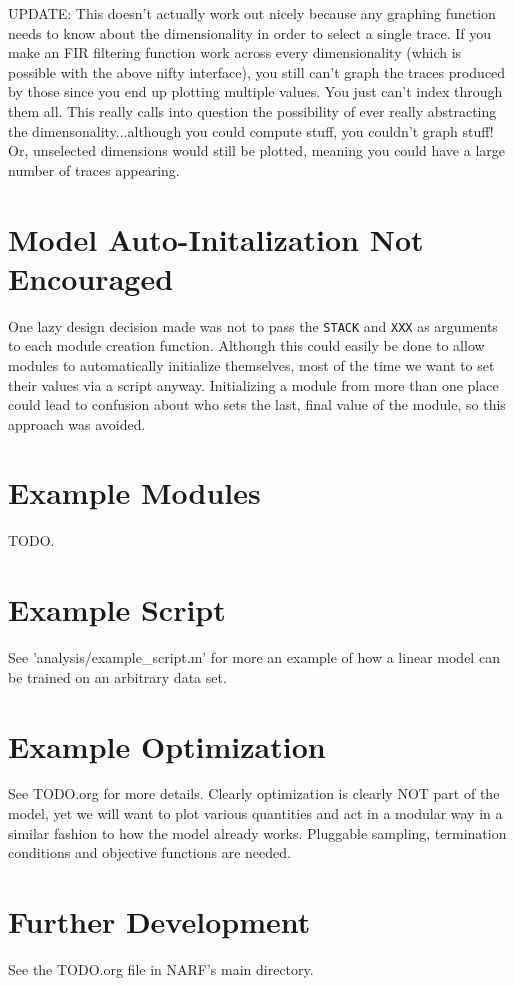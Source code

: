 \documentclass{article}
\newcommand{\matlab}[1]{\texttt{#1}}
\begin{document}
UPDATE: This doesn't actually work out nicely because any graphing function needs to know about the dimensionality in order to select a single trace. If you make an FIR filtering function work across every dimensionality (which is possible with the above nifty interface), you still can't graph the traces produced by those since you end up plotting multiple values. You just can't index through them all. This really calls into question the possibility of ever really abstracting the dimensonality...although you could compute stuff, you couldn't graph stuff! Or, unselected dimensions would still be plotted, meaning you could have a large number of traces appearing. 


\section{Model Auto-Initalization Not Encouraged}

One lazy design decision made was not to pass the \matlab{STACK} and \matlab{XXX} as arguments to each module creation function. Although this could easily be done to allow modules to automatically initialize themselves, most of the time we want to set their values via a script anyway. Initializing a module from more than one place could lead to confusion about who sets the last, final value of the module, so this approach was avoided.

\section{Example Modules}

TODO.

\section{Example Script}

See 'analysis/example\_script.m' for more an example of how a linear model can be trained on an arbitrary data set.


\section{Example Optimization}

See TODO.org for more details. Clearly optimization is clearly NOT part of the model, yet we will want to plot various quantities and act in a modular way in a similar fashion to how the model already works. Pluggable sampling, termination conditions and objective functions are needed. 

\section{Further Development}

See the TODO.org file in NARF's main directory.
\end{document}
